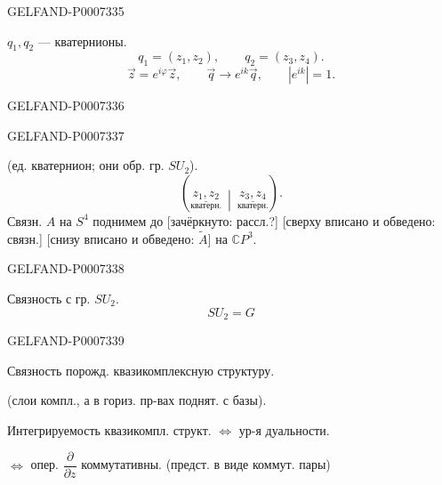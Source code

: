 \begin{GelfandAdjacentEvidence}{GELFAND-P000733}{5}


\(q_1,q_2\) --- кватернионы.
\[
q_1=(z_1,z_2),\qquad q_2=(z_3,z_4).
\]
\[
\vec z=e^{i\varphi}\vec z,\qquad
\vec q\to e^{ik}\vec q,\qquad |e^{ik}|=1.
\]
\end{GelfandAdjacentEvidence}
\begin{GelfandAdjacentEvidence}{GELFAND-P000733}{6}

\end{GelfandAdjacentEvidence}
\begin{GelfandAdjacentEvidence}{GELFAND-P000733}{7}


(ед. кватернион; они обр. гр. \(SU_2\)).
\[
\left(\underset{\text{кватерн.}}{\underline{z_1,z_2}}\ \middle|\
\underset{\text{кватерн.}}{\underline{z_3,z_4}}\right).
\]
Связн. \(A\) на \(S^4\) поднимем до [зачёркнуто: рассл.?]
[сверху вписано и обведено: связн.] [снизу вписано и обведено: \(\widetilde A\)] на \(\mathbb C P^3\).
\end{GelfandAdjacentEvidence}
\begin{GelfandAdjacentEvidence}{GELFAND-P000733}{8}


Связность с гр. \(SU_2\).
\[
SU_2=G
\]
\end{GelfandAdjacentEvidence}
\begin{GelfandAdjacentEvidence}{GELFAND-P000733}{9}


Связность порожд. квазикомплексную структуру.

(слои компл., а в гориз. пр-вах поднят. с базы).


Интегрируемость квазикомпл. структ. \(\Longleftrightarrow\) ур-я дуальности.

\(\Longleftrightarrow\) опер. \(\dfrac{\partial}{\partial z}\) коммутативны.
(предст. в виде коммут. пары)

\end{GelfandAdjacentEvidence}
